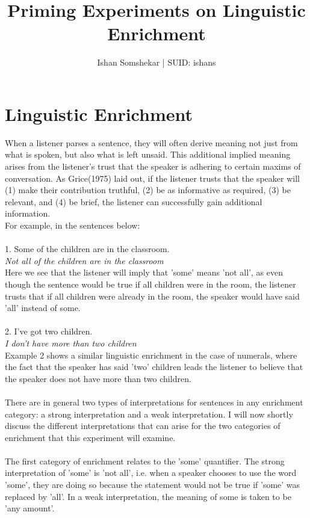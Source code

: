 \documentclass[]{article}
\title{Priming Experiments on Linguistic Enrichment}
\author{Ishan Somshekar | SUID: ishans}
\date{}
\begin{document}
\maketitle

\section*{Linguistic Enrichment}

When a listener parses a sentence, they will often derive meaning not just from what is spoken, but also what is left unsaid. This additional implied meaning arises from the listener's trust that the speaker is adhering to certain maxims of conversation. As Grice(1975) laid out, if the listener trusts that the speaker will (1) make their contribution truthful, (2) be as informative as required, (3) be relevant, and (4) be brief, the listener can successfully gain additional information. \\
For example, in the sentences below:\\
\\
1. Some of the children are in the classroom.\\
		\textit{Not all of the children are in the classroom}\\
Here we see that the listener will imply that 'some' means 'not all', as even though the sentence would be true if all children were in the room, the listener trusts that if all children were already in the room, the speaker would have said 'all' instead of some.\\
\\
2. I've got two children.\\
		\textit{I don't have more than two children}\\
Example 2 shows a similar linguistic enrichment in the case of numerals, where the fact that the speaker has said 'two' children leads the listener to believe that the speaker does not have more than two children.\\
\\
There are in general two types of interpretations for sentences in any enrichment category: a strong interpretation and a weak interpretation. I will now shortly discuss the different interpretations that can arise for the two categories of enrichment that this experiment will examine.\\
\\
The first category of enrichment relates to the 'some' quantifier. The strong interpretation of 'some' is 'not all', i.e. when a speaker chooses to use the word 'some', they are doing so because the statement would not be true if 'some' was replaced by 'all'. In a weak interpretation, the meaning of some is taken to be 'any amount'. \\
\end{document}
